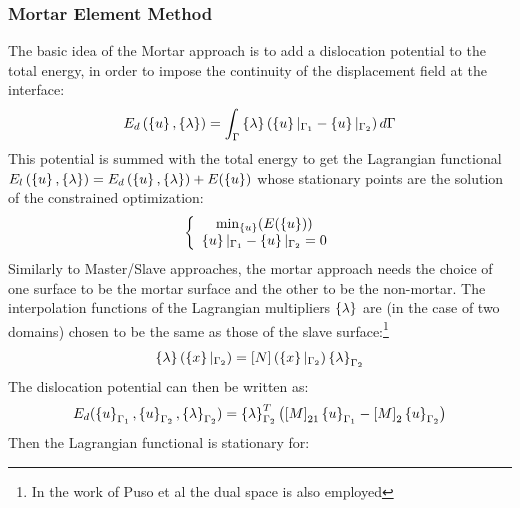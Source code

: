 \subsubsection{Mortar Element Method}\label{sssec341}
The basic idea of the Mortar approach is to add a dislocation potential to the total energy, in order to impose the continuity of the displacement field at the interface:
\begin{equation}
\label{eq.61}
E_d\left( \left\lbrace{u}\right \rbrace, \left\lbrace{\lambda}\right \rbrace \right)=\int_{\Gamma} \left\lbrace{\lambda}\right \rbrace\left(\left\lbrace{u}\right \rbrace|_{\Gamma_1}-\left\lbrace{u}\right \rbrace|_{\Gamma_2}\right)d\Gamma
\end{equation}
This potential is summed with the total energy to get the Lagrangian functional $E_l \left(\left\lbrace{u}\right \rbrace, \left\lbrace{\lambda}\right \rbrace \right)=E_d\left( \left\lbrace{u}\right \rbrace, \left\lbrace{\lambda}\right \rbrace \right)+E(\left\lbrace{u}\right \rbrace)$ whose stationary points are the solution of the constrained optimization:
\begin{equation}
\label{eq.62}
\left\lbrace \begin{array}{c}
\min_{\left\lbrace{u}\right \rbrace}(E(\left\lbrace{u}\right \rbrace))\\
  \left\lbrace{u}\right \rbrace|_{\Gamma_1}-\left\lbrace{u}\right \rbrace|_{\Gamma_2}=0
\end{array}\right.
\end{equation}
Similarly to Master/Slave approaches, the mortar approach needs the choice of one surface to be the mortar surface and the other to be the non-mortar.
The interpolation functions of the Lagrangian multipliers $\left\lbrace{\lambda}\right \rbrace$ are (in the case of two domains) chosen to be the same as those of the slave surface:\footnote{In the work of Puso et al \cite{puso20043d} the dual space is also employed}
\begin{equation}
\label{eq.63}
\left\lbrace{\lambda}\right \rbrace(\left\lbrace{x}\right \rbrace|_{\Gamma_2})=\left[{N}\right](\left\lbrace{x}\right \rbrace|_{\Gamma_2})\left\lbrace{\lambda}\right \rbrace_{\Gamma_2}
\end{equation}
The dislocation potential can then be written as:
\begin{equation}
\label{eq.64}
E_d( \left\lbrace{u}\right \rbrace_{\Gamma_1},\left\lbrace{u}\right \rbrace_{\Gamma_2},\left\lbrace{\lambda}\right \rbrace_{\Gamma_2})=\left\lbrace{\lambda}\right \rbrace_{\Gamma_2}^T\left(\left[{M}\right]_{21}\left\lbrace{u}\right \rbrace_{\Gamma_1}-\left[{M}\right]_2\left\lbrace{u}\right \rbrace_{\Gamma_2}\right)
\end{equation}
Then the Lagrangian functional is stationary  for:
